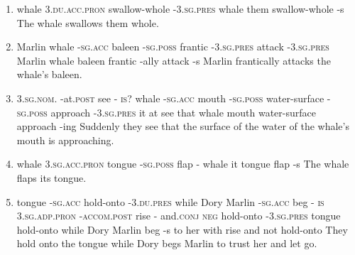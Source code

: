 \begin{enumerate}
\item
{}
{whale \textsc{3.du.acc.pron} swallow-whole -\textsc{3.sg.pres}}
{whale them swallow-whole -s}
{The whale swallows them whole.}

\item
{}
{Marlin whale -\textsc{sg.acc} baleen -\textsc{sg.poss} frantic -\textsc{3.sg.pres} attack -\textsc{3.sg.pres}}
{Marlin whale {} baleen {} frantic -ally attack -s}
{Marlin frantically attacks the whale's baleen.}

\item
{}
{\textsc{3.sg.nom.} -at.\textsc{post} see - \textsc{is?} whale -\textsc{sg.acc} mouth -\textsc{sg.poss} water-surface -\textsc{sg.poss} approach -\textsc{3.sg.pres}}
{it at see {} that whale {} mouth {} water-surface{} approach -ing}
{Suddenly they see that the surface of the water of the whale's mouth is approaching.}

\item
{}
{whale \textsc{3.sg.acc.pron} tongue -\textsc{sg.poss} flap -}
{whale it tongue {} flap -s}
{The whale flaps its tongue.}

\item
{}
{tongue -\textsc{sg.acc} hold-onto -\textsc{3.du.pres} while Dory Marlin -\textsc{sg.acc} beg - \textsc{is} \textsc{3.sg.adp.pron} -\textsc{accom.post} rise - and.\textsc{conj} \textsc{neg} hold-onto -\textsc{3.sg.pres}}
{tongue {} hold-onto {} while Dory Marlin {} beg -s to her with rise {} and not hold-onto {}}
{They hold onto the tongue while Dory begs Marlin to trust her and let go.}


\end{enumerate}
